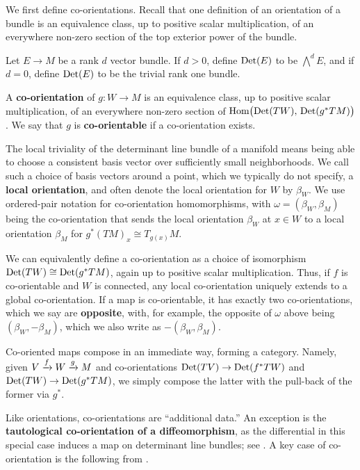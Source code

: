 We first define co-orientations.
Recall that one definition of an orientation of a bundle is an equivalence class, up to positive scalar multiplication, of an everywhere non-zero section of the top exterior power of the bundle.

\begin{definition}\label{D:co-orientations}
	Let $E \to M$ be a rank $d$ vector bundle.
	If $d > 0$, define ${\rm Det}(E)$ to be $\bigwedge^d E$, and if $d = 0$, define ${\rm Det}(E)$ to be the trivial rank one bundle.

	A \textbf{co-orientation} of $g \colon W \to M$ is an equivalence class, up to positive scalar multiplication, of an everywhere non-zero section of $\textup{Hom} \big( {\rm Det}(TW),\, {\rm Det}(g^*TM) \big)$.
	We say that $g$ is \textbf{co-orientable} if a co-orientation exists.
\end{definition}

The local triviality of the determinant line bundle of a manifold means being able to choose a consistent basis vector over sufficiently small neighborhoods.
We call such a choice of basis vectors around a point, which we typically do not specify, a \textbf{local orientation}, and often denote the local orientation for $W$ by $\beta_W$.
We use ordered-pair notation for co-orientation homomorphisms, with $\omega = (\beta_W, \beta_M)$ being the co-orientation that sends the local orientation $\beta_W$ at $x\in W$ to a local orientation $\beta_M$ for $g^*(TM)_x\cong T_{g(x)}M$.

We can equivalently define a co-orientation as a choice of isomorphism ${\rm Det}(TW)\cong {\rm Det}(g^*TM)$, again up to positive scalar multiplication.
Thus, if $f$ is co-orientable and $W$ is connected, any local co-orientation uniquely extends to a global co-orientation.
If a map is co-orientable, it has exactly two co-orientations, which we say are \textbf{opposite}, with, for example, the opposite of $\omega$ above being $(\beta_W, -\beta_M)$, which we also write as $-(\beta_W, \beta_M)$.

Co-oriented maps compose in an immediate way, forming a category.
Namely, given $V \xrightarrow{f} W \xrightarrow{g} M$ and co-orientations ${\rm Det}(TV) \to {\rm Det}(f^*TW)$ and ${\rm Det}(TW)\to {\rm Det}(g^*TM)$, we simply compose the latter with the pull-back of the former via $g^*$.

Like orientations, co-orientations are ``additional data.''
An exception is the {\bf tautological co-orientation of a diffeomorphism}, as the differential
in this special case induces a map on determinant line bundles; see \cite[Definition 3.14]{medina2022foundations}.
A key case of co-orientation is the following from \cite[Section 3.3]{medina2022foundations}.

